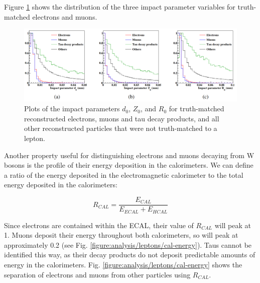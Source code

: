 Figure \ref{figure:analysis/leptons/impact-parameter} shows the distribution of the three impact parameter variables for truth-matched electrons and muons.

\begin{figure}[p]
	\centering
	\includegraphics[width=1.0\textwidth]{../Pictures/Analysis/impact-parameter.png}
	\caption{Plots of the impact parameters $d_0$, $Z_0$, and $R_0$ for truth-matched reconstructed electrons, muons and tau decay products, and all other reconstructed particles that were not truth-matched to a lepton.}
	\label{figure:analysis/leptons/impact-parameter}
\end{figure}

Another property useful for distinguishing electrons and muons decaying from W bosons is the profile of their energy deposition in the calorimeters. We can define a ratio of the energy deposited in the electromagnetic calorimeter to the total energy deposited in the calorimeters:

\begin{equation}
	R_{CAL} = \frac{E_{CAL}}{E_{ECAL} + E_{HCAL}}
\label{eq:calorimeter-ratio}
\end{equation}

Since electrons are contained within the \acrshort{ECAL}, their value of $R_{CAL}$ will peak at 1. Muons deposit their energy throughout both calorimeters, so will peak at approximately 0.2 (see Fig. \ref{figure:analysis/leptons/cal-energy}). Taus cannot be identified this way, as their decay products do not deposit predictable amounts of energy in the calorimeters. Fig. \ref{figure:analysis/leptons/cal-energy} shows the separation of electrons and muons from other particles using $R_{CAL}$.

